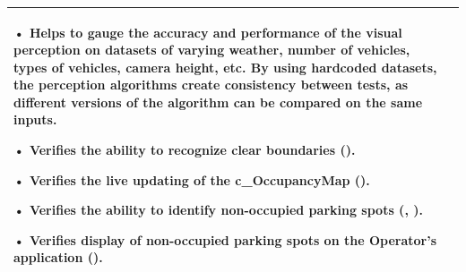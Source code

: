 \documentclass[12pt, titlepage]{article}
\begin{document}
\begin{table}[!h]
\begin{center}
\begin{tabular}{ | m{1.5cm} | m{15cm} | }
• Helps to gauge the accuracy and performance of the visual perception on datasets of varying weather, number of vehicles, types of vehicles, camera height, etc. By using hardcoded datasets, the perception algorithms create  consistency between tests, as different versions of the algorithm can be compared on the same inputs.

• Verifies the ability to recognize clear boundaries (\nameref{GEN_001}).

• Verifies the live updating of the c_OccupancyMap (\nameref{GEN_002}).

• Verifies the ability to identify non-occupied parking spots (\nameref{Gen_005}, \nameref{SR_009}).

• Verifies display of non-occupied parking spots on the Operator's application (\nameref{GEN_006}).
\\ 
\hline
\end{tabular}
\end{center}
\end{table}
\end{document}
